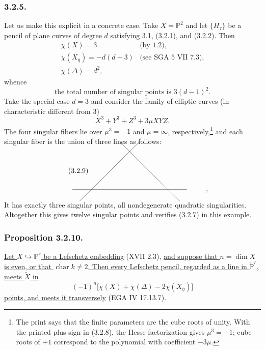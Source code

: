 \subsubsection*{3.2.5.}
Let us make this explicit in a concrete case.  Take $X=\mathbb P^2$ and let
$\{H_\tau\}$ be a pencil of plane curves of degree $d$ satisfying 3.1,
(3.2.1), and (3.2.2).  Then
\begin{equation}\tag{3.2.6}
\begin{array}{ll}
\chi(X)=3 & \text{(by 1.2)},\\[4pt]
\chi(X_{\bar\eta})=-d(d-3) & \text{(see SGA 5 VII 7.3)},\\[4pt]
\chi(\Delta)=d^2,&
\end{array}
\end{equation}
whence
\begin{equation}\tag{3.2.7}
\text{the total number of singular points is }3(d-1)^2.
\end{equation}
Take the special case $d=3$ and consider the family of elliptic curves
(in characteristic different from $3$)
\begin{equation}\tag{3.2.8}
X^3+Y^3+Z^3+3\mu XYZ.
\end{equation}
The four singular fibers lie over $\mu^3=-1$ and $\mu=\infty$,
respectively,\footnote{The print says that the finite parameters are the
cube roots of unity.  With the printed plus sign in (3.2.8), the Hesse
factorization gives $\mu^3=-1$; cube roots of $+1$ correspond to the
polynomial with coefficient $-3\mu$.}
and each singular fiber is the union of three lines as follows:
\begin{equation}\tag{3.2.9}
\begin{tikzcd}[row sep=4.5em,column sep=4.5em]
{} & {} \arrow[dl,dash,shorten <=-9mm,shorten >=-9mm]
        \arrow[dr,dash,shorten <=-9mm,shorten >=-9mm] & {} & {} \\
{} \arrow[rr,dash,shorten <=-11mm,shorten >=-11mm] & {} & {} & {,}
\end{tikzcd}
\end{equation}
It has exactly three singular points, all nondegenerate quadratic
singularities.  Altogether this gives twelve singular points and verifies
(3.2.7) in this example.

\subsubsection*{Proposition 3.2.10.}
\underline{Let $X\hookrightarrow\mathbb P^r$ be a Lefschetz embedding}
(XVII 2.3), \underline{and suppose that $n=\dim X$ is even, or that
$\operatorname{char}k\ne2$.  Then every Lefschetz pencil, regarded as a
line in $\check{\mathbb P}^{r}$, meets $\check X$ in}
\begin{equation}\tag{3.2.11}
(-1)^n\bigl[\chi(X)+\chi(\Delta)-2\chi(X_{\bar\eta})\bigr]
\end{equation}
\underline{points, and meets it transversely} (EGA IV 17.13.7).

